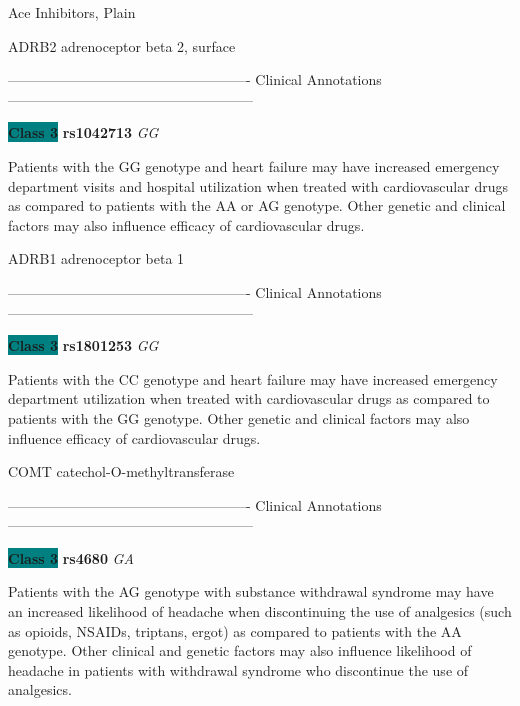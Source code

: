 \documentclass{resume} %
\begin{document}
\begin{rSection}{ Ace Inhibitors, Plain }
\item[]

\begin{rSubsection}{ ADRB2 }{ adrenoceptor beta 2, surface }{}{}
\item[]

\item[] ---------------------------------------------------- Clinical Annotations -----------------------------------------------------\newline
\item \textbf{\colorbox{teal} {Class 3}} \textbf{ rs1042713 } \textit{ GG }
\item[] Patients with the GG genotype and heart failure may have increased emergency department visits and hospital utilization when treated with cardiovascular drugs as compared to patients with the AA or AG genotype. Other genetic and clinical factors may also influence efficacy of cardiovascular drugs.
\end{rSubsection}\begin{rSubsection}{ ADRB1 }{ adrenoceptor beta 1 }{}{}
\item[]

\item[] ---------------------------------------------------- Clinical Annotations -----------------------------------------------------\newline
\item \textbf{\colorbox{teal} {Class 3}} \textbf{ rs1801253 } \textit{ GG }
\item[] Patients with the CC genotype and heart failure may have increased emergency department utilization when treated with cardiovascular drugs as compared to patients with the GG genotype. Other genetic and clinical factors may also influence efficacy of cardiovascular drugs.
\end{rSubsection}

\end{rSection}

\begin{rSubsection}{ COMT }{ catechol-O-methyltransferase }{}{}
\item[]

\item[] ---------------------------------------------------- Clinical Annotations -----------------------------------------------------\newline
\item \textbf{\colorbox{teal} {Class 3}} \textbf{ rs4680 } \textit{ GA }
\item[] Patients with the AG genotype with substance withdrawal syndrome may have an increased likelihood of headache when discontinuing the use of analgesics (such as opioids, NSAIDs, triptans, ergot) as compared to patients with the AA genotype. Other clinical and genetic factors may also influence likelihood of headache in patients with withdrawal syndrome who discontinue the use of analgesics.
\end{rSubsection}
\end{document}
